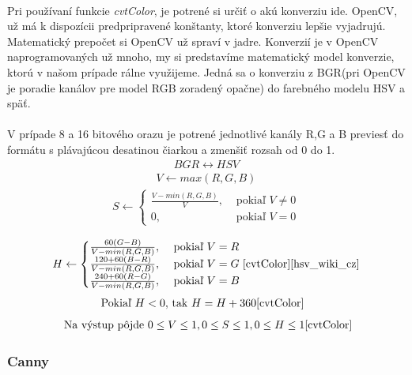 \documentclass[12pt]{article}
\begin{document}
\paragraph{}
Pri používaní funkcie \emph{cvtColor}, je potrené si určiť o akú konverziu ide. OpenCV, už má k dispozícii predpripravené konštanty, ktoré konverziu lepšie vyjadrujú.
Matematický prepočet si OpenCV už spraví v jadre. Konverzií je v OpenCV naprogramovaných už mnoho, my si predstavíme matematický model konverzie,
ktorú v našom prípade rálne využijeme. Jedná sa o konverziu z BGR(pri OpenCV je poradie kanálov pre model RGB zoradený opačne) do farebného modelu HSV a späť.
\cite{cvtColor}
\cite{OpenCVDoc}
\paragraph{} 
V prípade 8 a 16 bitového orazu je potrené jednotlivé kanály R,G a B previesť do formátu s plávajúcou desatinou čiarkou a zmenšiť rozsah od 0 do 1.
\begin{align*}
BGR \leftrightarrow HSV
\end{align*}
\begin{align*}
V \leftarrow max(R,G,B)
\end{align*}
\begin{align*}
S \leftarrow \begin{cases} \frac{V - min(R,G,B)}{V}, & \text{ pokiaľ } V \neq 0 \\ 0, & \text{ pokiaľ } V = 0 \end{cases} \\
\end{align*}
\begin{align*}
H \leftarrow \begin{cases} \frac{60(G - B)}{V - min(R,G,B)}, & \text{ pokiaľ } V = R \\ \frac{120 + 60(B - R)}{V - min(R,G,B)}, & \text{ pokiaľ } V = G \\ \frac{240 + 60(R - G)}{V - min(R,G,B)}, & \text{ pokiaľ } V = B \end{cases} 
\cite{cvtColor}
\cite{hsv_wiki_cz}
\end{align*}
\begin{align*}
\text{ Pokiaľ } H < 0, & \text{ tak } H = H + 360
\cite{cvtColor}
\end{align*}
\begin{align*}
\text{ Na výstup pôjde } 0 \le V \le 1, 0 \le S \le 1, 0 \le H \le 1
\cite{cvtColor}
\end{align*}
\subsubsection{Canny}
\end{document}
